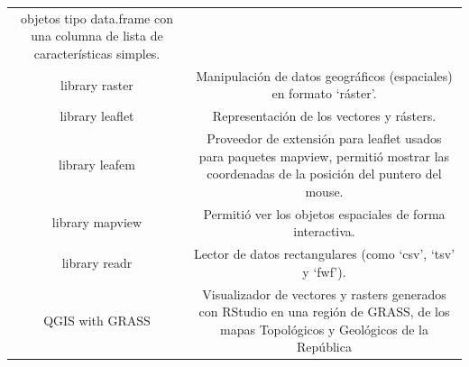 \documentclass[11pt,]{article}
\begin{document}
\begin{longtable}[]{@{}cc@{}}
\begin{minipage}[t]{0.83\columnwidth}
objetos tipo data.frame con una columna de lista de características
simples.\strut
\end{minipage}\tabularnewline
\begin{minipage}[t]{0.11\columnwidth}\centering\strut
library raster\strut
\end{minipage} & \begin{minipage}[t]{0.83\columnwidth}\centering\strut
Manipulación de datos geográficos (espaciales) en formato
`ráster'.\strut
\end{minipage}\tabularnewline
\begin{minipage}[t]{0.11\columnwidth}\centering\strut
library leaflet\strut
\end{minipage} & \begin{minipage}[t]{0.83\columnwidth}\centering\strut
Representación de los vectores y rásters.\strut
\end{minipage}\tabularnewline
\begin{minipage}[t]{0.11\columnwidth}\centering\strut
library leafem\strut
\end{minipage} & \begin{minipage}[t]{0.83\columnwidth}\centering\strut
Proveedor de extensión para leaflet usados para paquetes mapview,
permitió mostrar las coordenadas de la posición del puntero del
mouse.\strut
\end{minipage}\tabularnewline
\begin{minipage}[t]{0.11\columnwidth}\centering\strut
library mapview\strut
\end{minipage} & \begin{minipage}[t]{0.83\columnwidth}\centering\strut
Permitió ver los objetos espaciales de forma interactiva.\strut
\end{minipage}\tabularnewline
\begin{minipage}[t]{0.11\columnwidth}\centering\strut
library readr\strut
\end{minipage} & \begin{minipage}[t]{0.83\columnwidth}\centering\strut
Lector de datos rectangulares (como `csv', `tsv' y `fwf').\strut
\end{minipage}\tabularnewline
\begin{minipage}[t]{0.11\columnwidth}\centering\strut
QGIS with GRASS\strut
\end{minipage} & \begin{minipage}[t]{0.83\columnwidth}\centering\strut
Visualizador de vectores y rasters generados con RStudio en una región
de GRASS, de los mapas Topológicos y Geológicos de la República

\end{minipage}
\end{longtable}
\end{document}
